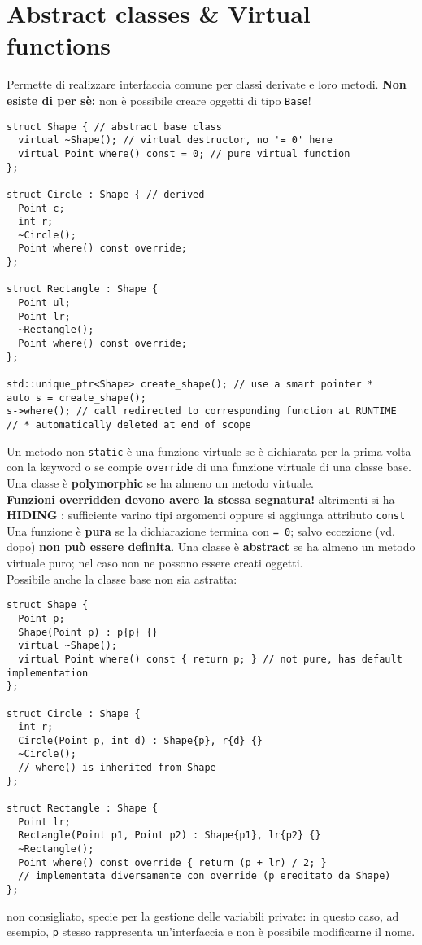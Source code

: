 \documentclass[10pt, oneside]{Book}
\begin{document}
\section{Abstract classes \& Virtual functions}
Permette di realizzare interfaccia comune per classi derivate e loro metodi. \textbf{Non esiste di per sè:} non è possibile creare oggetti di tipo \texttt{Base}!
\begin{verbatim}
struct Shape { // abstract base class
  virtual ~Shape(); // virtual destructor, no '= 0' here
  virtual Point where() const = 0; // pure virtual function
};

struct Circle : Shape { // derived
  Point c;
  int r;
  ~Circle();
  Point where() const override; 
};

struct Rectangle : Shape {
  Point ul;
  Point lr;
  ~Rectangle();
  Point where() const override;
};

std::unique_ptr<Shape> create_shape(); // use a smart pointer *
auto s = create_shape();
s->where(); // call redirected to corresponding function at RUNTIME
// * automatically deleted at end of scope
\end{verbatim}
Un metodo non \texttt{static} è una funzione virtuale se è dichiarata per la prima volta con la keyword o se compie \texttt{override} di una funzione virtuale di una classe base. Una classe è \textbf{polymorphic} se ha almeno un metodo virtuale.
\\\textbf{Funzioni overridden devono avere la stessa segnatura!} altrimenti si ha \textbf{HIDING} : sufficiente varino tipi argomenti oppure si aggiunga attributo \texttt{const}
\\Una funzione è \textbf{pura} se la dichiarazione termina con \texttt{= 0}; salvo eccezione (vd. dopo) \textbf{non può essere definita}. Una classe è \textbf{abstract} se ha almeno un metodo virtuale puro; nel caso non ne possono essere creati oggetti.
\\Possibile anche la classe base non sia astratta:
\begin{verbatim}
struct Shape {
  Point p;
  Shape(Point p) : p{p} {}
  virtual ~Shape();
  virtual Point where() const { return p; } // not pure, has default implementation
};

struct Circle : Shape {
  int r;
  Circle(Point p, int d) : Shape{p}, r{d} {}
  ~Circle();
  // where() is inherited from Shape
};

struct Rectangle : Shape {
  Point lr;
  Rectangle(Point p1, Point p2) : Shape{p1}, lr{p2} {}
  ~Rectangle();
  Point where() const override { return (p + lr) / 2; }
  // implementata diversamente con override (p ereditato da Shape)
};
\end{verbatim}
non consigliato, specie per la gestione delle variabili private: in questo caso, ad esempio, \texttt{p} stesso rappresenta un'interfaccia e non è possibile modificarne il nome.
\end{document}
